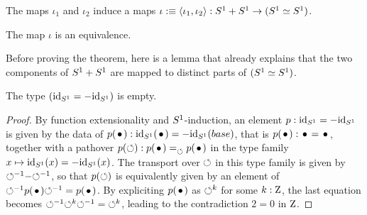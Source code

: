 \documentclass[english,a4]{article}
\begin{document}
The maps $\iota_1$ and $\iota_2$ induce a maps
$\iota \mathrel{\hbox{:}\mkern-5mu\equiv} \langle\iota_1,\iota_2\rangle : {S^1} + {S^1} \to ({S^1}\simeq
{S^1})$.
\begin{theorem*}
  The map $\iota$ is an equivalence.
\end{theorem*}
%
Before proving the theorem, here is a lemma that already explains that
the two components of ${S^1}+{S^1}$ are mapped to distinct parts of
$({S^1} \simeq {S^1})$.
\begin{lemma}
  \label{lemma:id-not-equal-oppid}%
  The type $(\mathord{\mathrm{id}}_{S^1} = -\mathord{\mathrm{id}}_{S^1})$ is empty.
\end{lemma}
\begin{proof}
  By function extensionality and ${S^1}$-induction, an element
  $p : \mathord{\mathrm{id}}_{S^1} = -\mathord{\mathrm{id}}_{S^1}$ is given by the data of
  $p(\base) : \id_\Sc(\base) = -\id_\Sc(base)$, that is
  $p(\base):\base=\base$, together with a pathover
  $p(\Sloop): \pathover {p(\base)} {} \Sloop {p(\base)}$ in the type
  family $x\mapsto \mathord{\mathrm{id}}_{S^1} (x)=-\mathord{\mathrm{id}}_{S^1} (x)$. The transport over
  $\mathord{\circlearrowleft}$ in this type family is given by
  ${\mathord{\circlearrowleft}}^{-1}\mathord{-}{\mathord{\circlearrowleft}}^{-1}$, so that $p(\mathord{\circlearrowleft})$ is equivalently
  given by an element of $\inv\Sloop p(\base) \inv\Sloop =
  p(\base)$. By expliciting $p(\base)$ as $\mathord{\circlearrowleft}^k$ for some
  $k:\mathrm{Z}$, the last equation becomes
  ${\mathord{\circlearrowleft}}^{-1} \mathord{\circlearrowleft}^k {\mathord{\circlearrowleft}}^{-1} = \mathord{\circlearrowleft}^k$, leading to the
  contradiction $2=0$ in $\mathrm{Z}$.
\end{proof}
\end{document}
